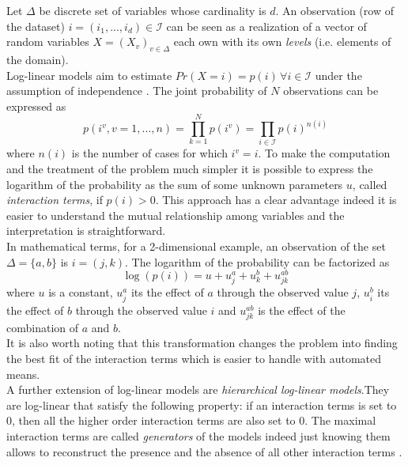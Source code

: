 \documentclass{article}
\begin{document}
Let $\Delta$ be discrete set of variables whose cardinality is $d$. An observation (row of the dataset) $i = (i_1,...,i_d) \in \mathcal{I}$ can be seen as a realization of a vector of random variables $X = (X_v)_{v \in \Delta}$ each own with its own \textit{levels} (i.e. elements of the domain).\\
Log-linear models aim to estimate $Pr(X=i) = p(i) \, \forall i \in \mathcal{I}$ under the assumption of independence . The joint probability of $N$ observations can be expressed as
\begin{equation}
p(i^v,v =1,...,n) = \prod\limits_{k=1}^{N}p(i^v) =  \prod\limits_{i \in \mathcal{I}}p(i)^{n(i)}
\end{equation}
where $n(i)$ is the number of cases for which $i^v = i$.
To make the computation and the treatment of the problem much simpler it is possible to express the logarithm of the probability as the sum of some unknown parameters $u$, called \textit{interaction terms}, if $p(i) > 0$. This approach has a clear advantage indeed it is easier to understand the mutual relationship among variables and the interpretation is straightforward. \\
In mathematical terms, for a 2-dimensional example, an observation of the set $\Delta = \{a,b\}$ is $i = (j,k)$. The logarithm of the probability can be factorized as
\begin{equation}
   \log(p(i)) = u + u^a_j  + u^b_k + u^{ab}_{jk} 
\end{equation}
where $u$ is a constant, $ u^a_j$ its the effect of $a$ through the observed value $j$,  $ u^b_i$ its the effect of $b$ through the observed value $i$ and  $u^{ab}_{jk}$ is the effect of the combination of $a$ and $b$. \\
It is also worth noting that this transformation changes the problem into finding the best fit of the interaction terms which is easier to handle with automated means.\\
A further extension of log-linear models are \textit{hierarchical log-linear models}.They are log-linear that satisfy the following property: if an interaction terms is set to 0, then all the higher order interaction terms are also set to 0. The maximal interaction terms are called \textit{generators} of the models indeed just knowing them allows to reconstruct the presence and the absence of all other interaction terms . \\
\end{document}
